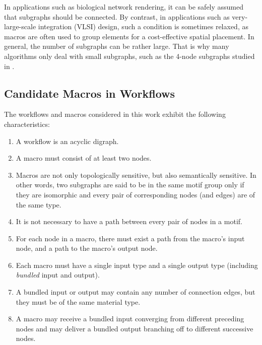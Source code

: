 \vspace{-1mm}
In applications such as biological network rendering, it can be safely assumed that subgraphs should be connected.
By contrast, in applications such as very-large-scale integration (VLSI) design, such a condition is sometimes relaxed, as macros are often used to group elements for a cost-effective spatial placement.
In general, the number of subgraphs can be rather large.
That is why many algorithms only deal with small subgraphs, such as the 4-node subgraphs studied in \cite{Milo:2002}.


\subsection{Candidate Macros in Workflows}
\label{sec:Conditions}
%
The workflows and macros considered in this work exhibit the following characteristics: 

\begin{enumerate}[itemsep=-1mm]
\item A workflow is an acyclic digraph.
\item A macro must consist of at least two nodes.
\item Macros are not only topologically sensitive, but also semantically sensitive. In other words, two subgraphs are said to be in the same motif group only if they are isomorphic and every pair of corresponding nodes (and edges) are of the same type.
\item It is not necessary to have a path between every pair of nodes in a motif.
\item For each node in a macro, there must exist a path from the macro's input node, and a path to the macro's output node.
\item Each macro must have a single input type and a single output type (including \emph{bundled} input and output).
\item A bundled input or output may contain any number of connection edges, but they must be of the same material type.
\item A macro may receive a bundled input converging from different preceding nodes and may deliver a bundled output branching off to different successive nodes.
\end{enumerate}

